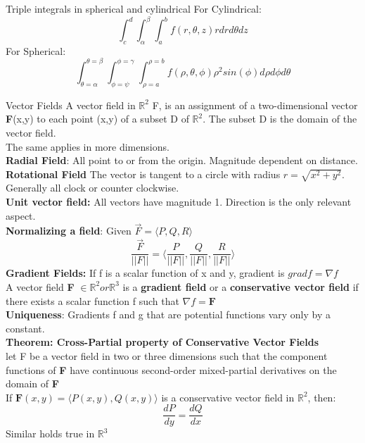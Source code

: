 \documentclass[a4paper, 12pt]{article}
\begin{document}
\begin{section}{Triple integrals in spherical and cylindrical}
For Cylindrical:
\begin{equation}
\int_{c}^{d}\int_{\alpha}^{\beta}\int_{a}^{b}f(r,\theta,z)rdrd\theta dz
\end{equation}
For Spherical:
\begin{equation} 
\int_{\theta=\alpha}^{\theta=\beta}\int_{\phi=\psi}^{\phi=\gamma}
\int_{\rho=a}^{\rho=b}f(\rho,\theta,\phi)\rho^{2}sin(\phi)d\rho d\phi 
d\theta
\end{equation}
\end{section}
\begin{section}{Vector Fields}
A vector field in $\mathbb{R}^{2}$ F, is an assignment of a 
two-dimensional vector \textbf{F}(x,y) to each point (x,y) of a subset D of $\mathbb{R}^{2}$. The subset D is the domain of the vector field.\\
The same applies in more dimensions.\\
\textbf{Radial Field}: All point to or from the origin. Magnitude
dependent on distance.\\
\textbf{Rotational Field} The vector is tangent to a circle with radius
$r=\sqrt{x^{2}+y^{2}}$. Generally all clock or counter clockwise.\\
\textbf{Unit vector field:} All vectors have magnitude 1. Direction is 
the only relevant aspect.\\
\textbf{Normalizing a field}:
Given $\vec{F}=\langle P,Q,R\rangle$
\begin{equation} \label{Unit vector field}
\frac{\vec{F}}{||F||}=\langle \frac{P}{||F||},\frac{Q}{||F||},
\frac{R}{||F||}\rangle
\end{equation}
\textbf{Gradient Fields:} If f is a scalar function of x and y, gradient
is $gradf=\nabla f$\\
A vector field \textbf{F} $\in \mathbb{R}^{2} or \mathbb{R}^{3}$ is a 
\textbf{gradient field} or a \textbf{conservative vector field} if there 
exists a scalar function f such that $\nabla f=\textbf{F}$\\
\textbf{Uniqueness}: Gradients f and g that are potential functions vary
only by a constant.\\ 
\textbf{Theorem: Cross-Partial property of Conservative Vector Fields}\\
let F be a vector field in two or three dimensions such that the 
component functions of \textbf{F} have continuous second-order 
mixed-partial derivatives on the domain of \textbf{F}\\
If $\textbf{F}(x,y)=\langle P(x,y),Q(x,y)\rangle$ is a conservative 
vector field in $\mathbb{R}^{2}$, then:
\begin{equation}
	\frac{dP}{dy}=\frac{dQ}{dx}
\end{equation}
Similar holds true in $\mathbb{R}^{3}$


\end{section}
\end{document}
